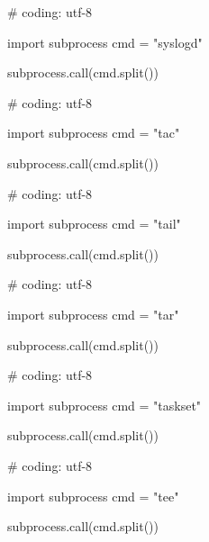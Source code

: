 \begin{mylisting}[label={lst:acpid},language=sh,caption=syslogd]

# coding: utf-8

import subprocess
cmd = "syslogd"

subprocess.call(cmd.split())

\end{mylisting}

\begin{mylisting}[label={lst:acpid},language=sh,caption=tac]

# coding: utf-8

import subprocess
cmd = "tac"

subprocess.call(cmd.split())

\end{mylisting}

\begin{mylisting}[label={lst:acpid},language=sh,caption=tail]

# coding: utf-8

import subprocess
cmd = "tail"

subprocess.call(cmd.split())

\end{mylisting}

\begin{mylisting}[label={lst:acpid},language=sh,caption=tar]

# coding: utf-8

import subprocess
cmd = "tar"

subprocess.call(cmd.split())

\end{mylisting}

\begin{mylisting}[label={lst:acpid},language=sh,caption=taskset]

# coding: utf-8

import subprocess
cmd = "taskset"

subprocess.call(cmd.split())

\end{mylisting}

\begin{mylisting}[label={lst:acpid},language=sh,caption=tee]

# coding: utf-8

import subprocess
cmd = "tee"

subprocess.call(cmd.split())

\end{mylisting}

